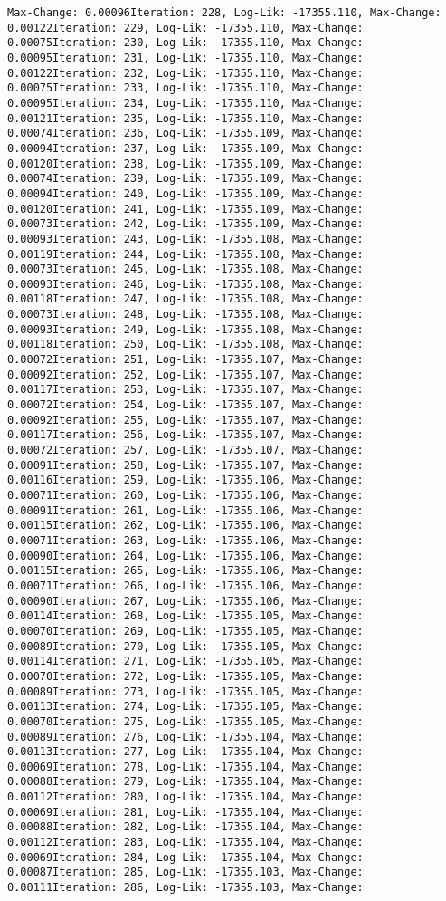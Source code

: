 \documentclass[
]{article}
\begin{document}
\begin{verbatim}
Max-Change: 0.00096Iteration: 228, Log-Lik: -17355.110, Max-Change: 0.00122Iteration: 229, Log-Lik: -17355.110, Max-Change: 0.00075Iteration: 230, Log-Lik: -17355.110, Max-Change: 0.00095Iteration: 231, Log-Lik: -17355.110, Max-Change: 0.00122Iteration: 232, Log-Lik: -17355.110, Max-Change: 0.00075Iteration: 233, Log-Lik: -17355.110, Max-Change: 0.00095Iteration: 234, Log-Lik: -17355.110, Max-Change: 0.00121Iteration: 235, Log-Lik: -17355.110, Max-Change: 0.00074Iteration: 236, Log-Lik: -17355.109, Max-Change: 0.00094Iteration: 237, Log-Lik: -17355.109, Max-Change: 0.00120Iteration: 238, Log-Lik: -17355.109, Max-Change: 0.00074Iteration: 239, Log-Lik: -17355.109, Max-Change: 0.00094Iteration: 240, Log-Lik: -17355.109, Max-Change: 0.00120Iteration: 241, Log-Lik: -17355.109, Max-Change: 0.00073Iteration: 242, Log-Lik: -17355.109, Max-Change: 0.00093Iteration: 243, Log-Lik: -17355.108, Max-Change: 0.00119Iteration: 244, Log-Lik: -17355.108, Max-Change: 0.00073Iteration: 245, Log-Lik: -17355.108, Max-Change: 0.00093Iteration: 246, Log-Lik: -17355.108, Max-Change: 0.00118Iteration: 247, Log-Lik: -17355.108, Max-Change: 0.00073Iteration: 248, Log-Lik: -17355.108, Max-Change: 0.00093Iteration: 249, Log-Lik: -17355.108, Max-Change: 0.00118Iteration: 250, Log-Lik: -17355.108, Max-Change: 0.00072Iteration: 251, Log-Lik: -17355.107, Max-Change: 0.00092Iteration: 252, Log-Lik: -17355.107, Max-Change: 0.00117Iteration: 253, Log-Lik: -17355.107, Max-Change: 0.00072Iteration: 254, Log-Lik: -17355.107, Max-Change: 0.00092Iteration: 255, Log-Lik: -17355.107, Max-Change: 0.00117Iteration: 256, Log-Lik: -17355.107, Max-Change: 0.00072Iteration: 257, Log-Lik: -17355.107, Max-Change: 0.00091Iteration: 258, Log-Lik: -17355.107, Max-Change: 0.00116Iteration: 259, Log-Lik: -17355.106, Max-Change: 0.00071Iteration: 260, Log-Lik: -17355.106, Max-Change: 0.00091Iteration: 261, Log-Lik: -17355.106, Max-Change: 0.00115Iteration: 262, Log-Lik: -17355.106, Max-Change: 0.00071Iteration: 263, Log-Lik: -17355.106, Max-Change: 0.00090Iteration: 264, Log-Lik: -17355.106, Max-Change: 0.00115Iteration: 265, Log-Lik: -17355.106, Max-Change: 0.00071Iteration: 266, Log-Lik: -17355.106, Max-Change: 0.00090Iteration: 267, Log-Lik: -17355.106, Max-Change: 0.00114Iteration: 268, Log-Lik: -17355.105, Max-Change: 0.00070Iteration: 269, Log-Lik: -17355.105, Max-Change: 0.00089Iteration: 270, Log-Lik: -17355.105, Max-Change: 0.00114Iteration: 271, Log-Lik: -17355.105, Max-Change: 0.00070Iteration: 272, Log-Lik: -17355.105, Max-Change: 0.00089Iteration: 273, Log-Lik: -17355.105, Max-Change: 0.00113Iteration: 274, Log-Lik: -17355.105, Max-Change: 0.00070Iteration: 275, Log-Lik: -17355.105, Max-Change: 0.00089Iteration: 276, Log-Lik: -17355.104, Max-Change: 0.00113Iteration: 277, Log-Lik: -17355.104, Max-Change: 0.00069Iteration: 278, Log-Lik: -17355.104, Max-Change: 0.00088Iteration: 279, Log-Lik: -17355.104, Max-Change: 0.00112Iteration: 280, Log-Lik: -17355.104, Max-Change: 0.00069Iteration: 281, Log-Lik: -17355.104, Max-Change: 0.00088Iteration: 282, Log-Lik: -17355.104, Max-Change: 0.00112Iteration: 283, Log-Lik: -17355.104, Max-Change: 0.00069Iteration: 284, Log-Lik: -17355.104, Max-Change: 0.00087Iteration: 285, Log-Lik: -17355.103, Max-Change: 0.00111Iteration: 286, Log-Lik: -17355.103, Max-Change: 
\end{verbatim}
\end{document}
